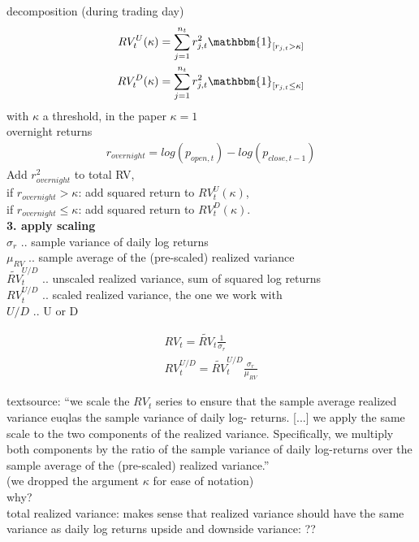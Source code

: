 \documentclass{article}
\begin{document}
decomposition (during trading day)
\begin{align*}
RV_{t}^{U}(\kappa) = \sum_{j=1}^{n_{t}} r_{j,t}^{2} \mathbbm{1}_{[r_{j,t} > \kappa]}\\
RV_{t}^{D}(\kappa) = \sum_{j=1}^{n_{t}} r_{j,t}^{2} \mathbbm{1}_{[r_{j,t} \leq \kappa]}
\end{align*}
with $\kappa$ a threshold, in the paper $\kappa = 1$\\

overnight returns
\begin{align*}
r_{overnight} = log(p_{open,t}) - log(p_{close, t-1})
\end{align*}
Add $r_{overnight}^{2}$ to total RV, \\
if $r_{overnight} > \kappa$: add squared return to $RV_{t}^{U}(\kappa)$, \\
if $r_{overnight} \leq \kappa$: add squared return to $RV_{t}^{D}(\kappa)$. \\

\textbf{3. apply scaling}\\

$\sigma_{r}$ .. sample variance of daily log returns\\
$\mu_{RV}$  .. sample average of the (pre-scaled) realized variance\\
$\tilde{RV}_{t}^{U/D}$ .. unscaled realized variance, sum of squared log returns\\
$RV_{t}^{U/D}$  .. scaled realized variance, the one we work with\\
$U/D$ .. U or D

\begin{align*}
RV_{t} = \tilde{RV}_{t} \frac{1}{\sigma_{r}}\\
RV_{t}^{U/D} = \tilde{RV}_{t}^{U/D}  \frac{\sigma_{r}}{\mu_{RV}}
\end{align*}

textsource: 
``we scale the $RV_{t}$ series to ensure that the sample average realized variance euqlas the sample variance of daily log- returns. [...] we apply the same scale to the two components of the realized variance. Specifically, we multiply both components by the ratio of the sample variance of daily log-returns over the sample average of the (pre-scaled) realized variance.''\\ (we dropped the argument $\kappa$ for ease of notation)\\

why?\\
total realized variance: makes sense that realized variance should have the same variance as daily log returns
upside and downside variance: ??\\
\end{document}

